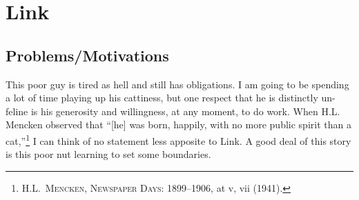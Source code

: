 \section{Link}
  \subsection{Problems/Motivations}
  This poor guy is tired as hell and still has obligations. I am going to be spending a lot of time playing up his cattiness, but one respect that he is distinctly un-feline is his generosity and willingness, at any moment, to do work. When H.L. Mencken observed that ``[he] was born, happily, with no more public spirit than a cat,''\footnote{\textsc{H.L.~Mencken, Newspaper Days: 1899--1906}, at v, vii (1941).} I can think of no statement less apposite to Link. A good deal of this story is this poor nut learning to set some boundaries. 
